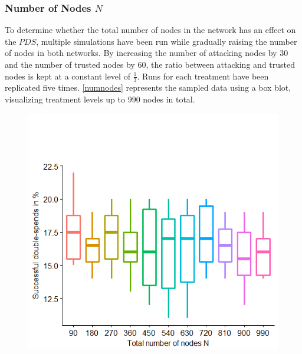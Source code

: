 \documentclass[a4paper,12pt,twoside]{report}
\begin{document}
\subsubsection{Number of Nodes $N$}
To determine whether the total number of nodes in the network has an effect on the $PDS$, multiple simulations have been run while gradually raising the number of nodes in both networks. By increasing the number of attacking nodes by 30 and the number of trusted nodes by 60, the ratio between attacking and trusted nodes is kept at a constant level of $\frac{1}{3}$. Runs for each treatment have been replicated five times.  \autoref{numnodes} represents the sampled data using a box blot, visualizing treatment levels up to 990 nodes in total.
\begin{figure}
\centering
\begin{minipage}{.5\textwidth}
  \centering
  \includegraphics[width=\linewidth]{Experiments/numnodes.png}
  \label{numnodes}
\end{minipage}%
\begin{minipage}{.5\textwidth}
  \centering

\end{minipage}
\end{figure}
\end{document}
